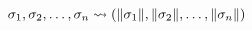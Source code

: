 \documentclass[acmlarge]{acmart}
\begin{document}
  \begin{figure}[h!]
    \begin{mdframed}
      \begin{center}
      \end{center}

      \[ \utrans{\tpoly_1, \tpoly_2, \ldots, \tpoly_n}{(\utovar{\tpoly_1}, \utovar{\tpoly_2}, \ldots, \utovar{\tpoly_n})} \]

      \vspace{0.3cm}

      \begin{center}
        \framebox{$\entails{\icontext; \gcontext}{\utrans{\hastype{\lterm}{\tmono}}{\lterm}}$}
      \end{center}

      \medskip

      \begin{prooftree}
      \end{prooftree}

      \begin{prooftree}
      \end{prooftree}

      \begin{prooftree}
      \end{prooftree}


\end{mdframed}
\end{figure}
\end{document}
